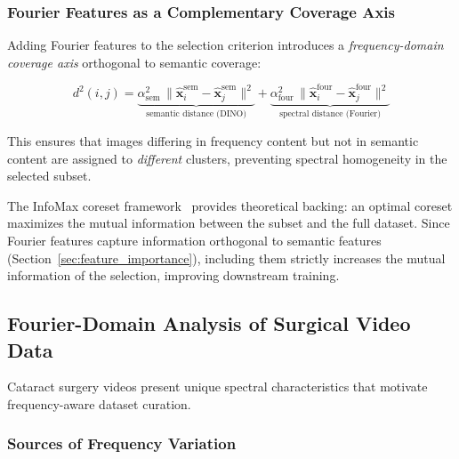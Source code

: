 \subsubsection{Fourier Features as a Complementary Coverage Axis}

Adding Fourier features to the selection criterion introduces a
\emph{frequency-domain coverage axis} orthogonal to semantic coverage:

\begin{equation}
    d^2(i,j) = \underbrace{\alpha_{\text{sem}}^2\,
                \|\hat{\mathbf{x}}_i^{\text{sem}} - \hat{\mathbf{x}}_j^{\text{sem}}\|^2}
               _{\text{semantic distance (DINO)}}
             + \underbrace{\alpha_{\text{four}}^2\,
                \|\hat{\mathbf{x}}_i^{\text{four}} - \hat{\mathbf{x}}_j^{\text{four}}\|^2}
               _{\text{spectral distance (Fourier)}}
    \label{eq:combined_distance}
\end{equation}

This ensures that images differing in frequency content but not in semantic
content are assigned to \emph{different} clusters, preventing spectral
homogeneity in the selected subset.

The InfoMax coreset framework~\cite{infomax2025} provides theoretical
backing: an optimal coreset maximizes the mutual information between the
subset and the full dataset.  Since Fourier features capture information
orthogonal to semantic features (Section~\ref{sec:feature_importance}),
including them strictly increases the mutual information of the selection,
improving downstream training.


\subsection{Fourier-Domain Analysis of Surgical Video Data}
\label{sec:surgical_fourier}

Cataract surgery videos present unique spectral characteristics that motivate
frequency-aware dataset curation.

\subsubsection{Sources of Frequency Variation}

